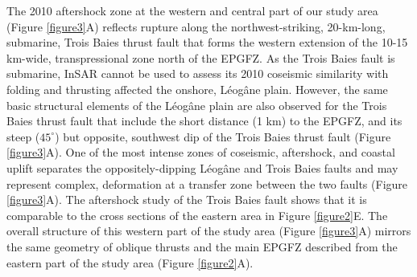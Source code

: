 \documentclass{nature}
\begin{document}
The 2010 aftershock zone at the western and central part of our study area (Figure \ref{figure3}A) reflects rupture along the northwest-striking, 20-km-long, submarine, Trois Baies thrust fault that forms the western extension of the 10-15 km-wide, transpressional zone north of the EPGFZ. As the Trois Baies fault is submarine, InSAR cannot be used to assess its 2010 coseismic similarity with folding and thrusting affected the onshore, L\'eog\^ane plain. However, the same basic structural elements of the L\'eog\^ane plain are also observed for the Trois Baies thrust fault that include the short distance (1 km) to the EPGFZ, and its steep ($45^{\circ}$) but opposite, southwest dip of the Trois Baies thrust fault (Figure \ref{figure3}A). One of the most intense zones of coseismic, aftershock, and coastal uplift separates the oppositely-dipping L\'eog\^ane and Trois Baies faults and may represent complex, deformation at a transfer zone between the two faults (Figure \ref{figure3}A). The aftershock study of the Trois Baies fault \citep{symithe2016present} shows that it is comparable to the cross sections of the eastern area in Figure \ref{figure2}E. The overall structure of this western part of the study area (Figure \ref{figure3}A) mirrors the same geometry of oblique thrusts and the main EPGFZ described from the eastern part of the study area (Figure \ref{figure2}A).
\end{document}
